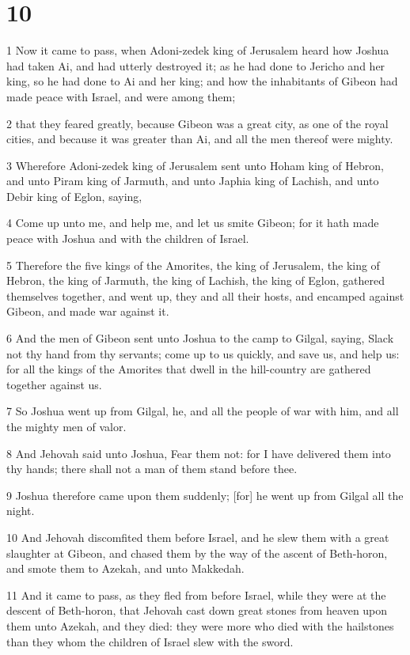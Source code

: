 \chapter{10}

\par 1 Now it came to pass, when Adoni-zedek king of Jerusalem heard how Joshua had taken Ai, and had utterly destroyed it; as he had done to Jericho and her king, so he had done to Ai and her king; and how the inhabitants of Gibeon had made peace with Israel, and were among them;
\par 2 that they feared greatly, because Gibeon was a great city, as one of the royal cities, and because it was greater than Ai, and all the men thereof were mighty.
\par 3 Wherefore Adoni-zedek king of Jerusalem sent unto Hoham king of Hebron, and unto Piram king of Jarmuth, and unto Japhia king of Lachish, and unto Debir king of Eglon, saying,
\par 4 Come up unto me, and help me, and let us smite Gibeon; for it hath made peace with Joshua and with the children of Israel.
\par 5 Therefore the five kings of the Amorites, the king of Jerusalem, the king of Hebron, the king of Jarmuth, the king of Lachish, the king of Eglon, gathered themselves together, and went up, they and all their hosts, and encamped against Gibeon, and made war against it.
\par 6 And the men of Gibeon sent unto Joshua to the camp to Gilgal, saying, Slack not thy hand from thy servants; come up to us quickly, and save us, and help us: for all the kings of the Amorites that dwell in the hill-country are gathered together against us.
\par 7 So Joshua went up from Gilgal, he, and all the people of war with him, and all the mighty men of valor.
\par 8 And Jehovah said unto Joshua, Fear them not: for I have delivered them into thy hands; there shall not a man of them stand before thee.
\par 9 Joshua therefore came upon them suddenly; [for] he went up from Gilgal all the night.
\par 10 And Jehovah discomfited them before Israel, and he slew them with a great slaughter at Gibeon, and chased them by the way of the ascent of Beth-horon, and smote them to Azekah, and unto Makkedah.
\par 11 And it came to pass, as they fled from before Israel, while they were at the descent of Beth-horon, that Jehovah cast down great stones from heaven upon them unto Azekah, and they died: they were more who died with the hailstones than they whom the children of Israel slew with the sword.
